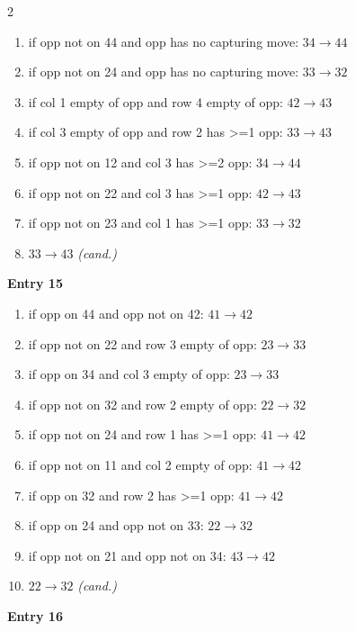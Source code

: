 \begin{multicols}{2}
\begin{tikzpicture}[scale=0.24]
\end{tikzpicture}
\nopagebreak\begin{enumerate}[topsep=1pt,itemsep=0pt,parsep=0pt,leftmargin=2.2em,label=\arabic*.]
\item if opp not on 44 and opp has no capturing move: $34\!\to\!44$
\item if opp not on 24 and opp has no capturing move: $33\!\to\!32$
\item if col 1 empty of opp and row 4 empty of opp: $42\!\to\!43$
\item if col 3 empty of opp and row 2 has >=1 opp: $33\!\to\!43$
\item if opp not on 12 and col 3 has >=2 opp: $34\!\to\!44$
\item if opp not on 22 and col 3 has >=1 opp: $42\!\to\!43$
\item if opp not on 23 and col 1 has >=1 opp: $33\!\to\!32$
\item $33\!\to\!43$ \hfill\textit{(cand.)}
\end{enumerate}\smallskip
\noindent\textbf{Entry 15} \; 
\nopagebreak\begin{enumerate}[topsep=1pt,itemsep=0pt,parsep=0pt,leftmargin=2.2em,label=\arabic*.]
\item if opp on 44 and opp not on 42: $41\!\to\!42$
\item if opp not on 22 and row 3 empty of opp: $23\!\to\!33$
\item if opp on 34 and col 3 empty of opp: $23\!\to\!33$
\item if opp not on 32 and row 2 empty of opp: $22\!\to\!32$
\item if opp not on 24 and row 1 has >=1 opp: $41\!\to\!42$
\item if opp not on 11 and col 2 empty of opp: $41\!\to\!42$
\item if opp on 32 and row 2 has >=1 opp: $41\!\to\!42$
\item if opp on 24 and opp not on 33: $22\!\to\!32$
\item if opp not on 21 and opp not on 34: $43\!\to\!42$
\item $22\!\to\!32$ \hfill\textit{(cand.)}
\end{enumerate}\smallskip
\noindent\textbf{Entry 16} \; 
\end{multicols}
